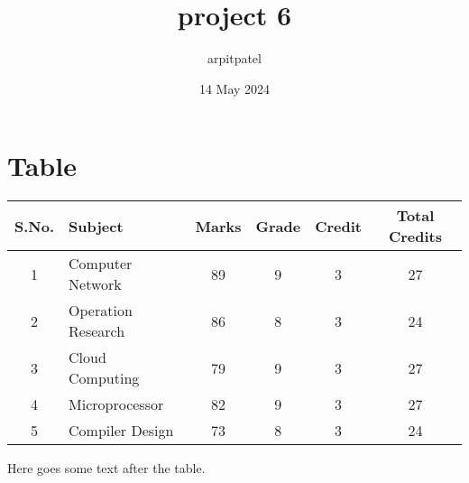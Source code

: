 \documentclass{article}
\title{project 6}
\author{arpitpatel }
\date{14 May 2024}
\begin{document}
\maketitle

\section*{\textbf{\Large Table} \\}
\begin{center}
    \begin{tabular}{c l c c c c}
     \hline
     \textbf{S.No.}&\textbf{Subject}&\textbf{Marks}&\textbf{Grade}&\textbf{Credit}&\textbf{Total Credits} \\ \hline
     1&Computer Network&89&9&3&27 \\ 
     2&Operation Research&86&8&3&24 \\ 
     3&Cloud Computing&79&9&3&27 \\ 
     4&Microprocessor&82&9&3&27 \\ 
     5&Compiler Design&73&8&3&24 \\ \hline
\end{tabular}
\end{center}

\vspace{1cm} %

Here goes some text after the table.
\end{document}
